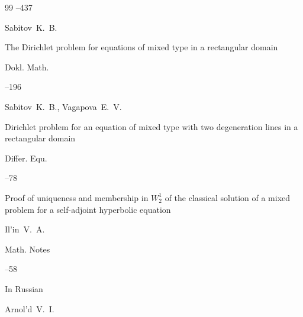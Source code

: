 \begin{thebibliography}{99}
--437






\by Sabitov~K.~B.

\paper The Dirichlet problem for equations of mixed type in a rectangular domain

\jour Dokl. Math. 




–196 











\by Sabitov~K.~B., Vagapova~E.~V.

\paper Dirichlet problem for an equation of mixed type with two degeneration lines in a rectangular domain

\jour Differ. Equ.



--78 






\paper Proof of uniqueness and membership in $W_ 2^ 1$ of the classical solution of a mixed problem for a self-adjoint hyperbolic equation

\by Il'in~V.~A.

\jour Math. Notes




--58







\lang In Russian

\by Arnol'd~V.~I.


\end{thebibliography}
